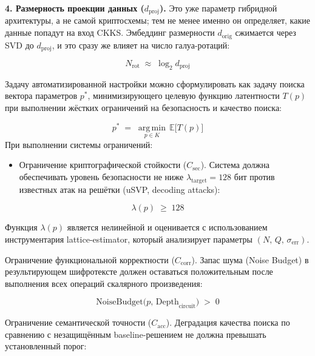 \documentclass[a4paper, 12pt, oneside, openany]{article}
\begin{document}
\textbf{4. Размерность проекции данных ($d_{\mathrm{proj}}$).} Это уже параметр гибридной архитектуры, а не самой криптосхемы; тем не менее именно он определяет, какие данные попадут на вход CKKS. Эмбеддинг размерности $d_{\mathrm{orig}}$ сжимается через SVD до $d_{\mathrm{proj}}$, и это сразу же влияет на число галуа-ротаций:

\begin{equation}
	N_{\mathrm{rot}} \;\approx\; \log_{2} d_{\mathrm{proj}}
	\label{eq:3-3}
\end{equation}

Задачу автоматизированной настройки можно сформулировать как задачу поиска вектора параметров $p^{*}$, минимизирующего целевую функцию латентности $T(p)$ при выполнении жёстких ограничений на безопасность и качество поиска:

\begin{equation}
	p^{*} \;=\; \operatorname*{arg\,min}_{p \in K}\, \mathbb{E}\bigl[ T(p) \bigr]
	\label{eq:3-4}
\end{equation}
При выполнении системы ограничений:
\begin{itemize}
	\item Ограничение криптографической стойкости ($C_{\sec}$). Система должна обеспечивать уровень безопасности не ниже $\lambda_{\mathrm{target}} = 128$ бит против известных атак на решётки (uSVP, decoding attacks):
\end{itemize}

\begin{equation}
	\lambda(p) \;\geq\; 128
	\label{eq:3-5}
\end{equation}

Функция $\lambda(p)$ является нелинейной и оценивается с использованием инструментария lattice-estimator, который анализирует параметры $(N,\, Q,\, \sigma_{\mathrm{err}})$.

Ограничение функциональной корректности ($C_{\mathrm{corr}}$). Запас шума (Noise Budget) в результирующем шифротексте должен оставаться положительным после выполнения всех операций скалярного произведения:

\begin{equation}
	\mathrm{NoiseBudget}\bigl( p,\, \mathrm{Depth}_{\mathrm{circuit}} \bigr) \;>\; 0
	\label{eq:3-6}
\end{equation}

Ограничение семантической точности ($C_{\mathrm{acc}}$). Деградация качества поиска по сравнению с незащищённым baseline-решением не должна превышать установленный порог:
\end{document}
